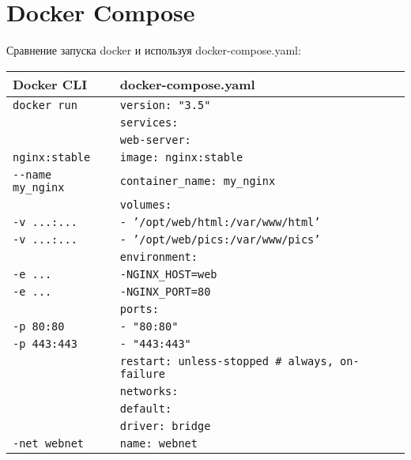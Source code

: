 \section{Docker Compose}

Сравнение запуска docker и используя docker-compose.yaml: \\
\begin{tabular}{| l | l |}
	\hline
	Docker CLI & docker-compose.yaml \\
	\hline
	\texttt{docker run} & \texttt{version: "3.5"} \\
	 & \texttt{services:} \\
	 & \texttt{\indent web-server:} \\
	 \texttt{nginx:stable} & \texttt{\indent\indent image: nginx:stable} \\
	 \texttt{{-}-name my\_nginx} & \texttt{\indent\indent container\_name: my\_nginx} \\
	 & \texttt{\indent \indent volumes:} \\
	 \texttt{-v ...:...} & \texttt{\indent \indent \indent - '/opt/web/html:/var/www/html'} \\
	 \texttt{-v ...:...} & \texttt{\indent \indent \indent - '/opt/web/pics:/var/www/pics'} \\
	 & \texttt{\indent \indent environment:} \\
	 \texttt{-e ...} & \texttt{\indent \indent \indent -NGINX\_HOST=web} \\
	 \texttt{-e ...} & \texttt{\indent \indent \indent -NGINX\_PORT=80} \\
	 & \texttt{\indent \indent ports: } \\
	 \texttt{-p 80:80} & \texttt{\indent \indent \indent - "80:80" } \\
	 \texttt{-p 443:443} & \texttt{\indent \indent \indent - "443:443" } \\
	 & \texttt{\indent \indent restart: unless-stopped \# always, on-failure } \\
	 & \texttt{\indent \indent networks: } \\
	 & \texttt{\indent \indent \indent default: } \\
	 & \texttt{\indent \indent \indent \indent driver: bridge } \\
	 \texttt{-net webnet} & \texttt{\indent \indent \indent \indent name: webnet } \\
	\hline
\end{tabular}

\\
